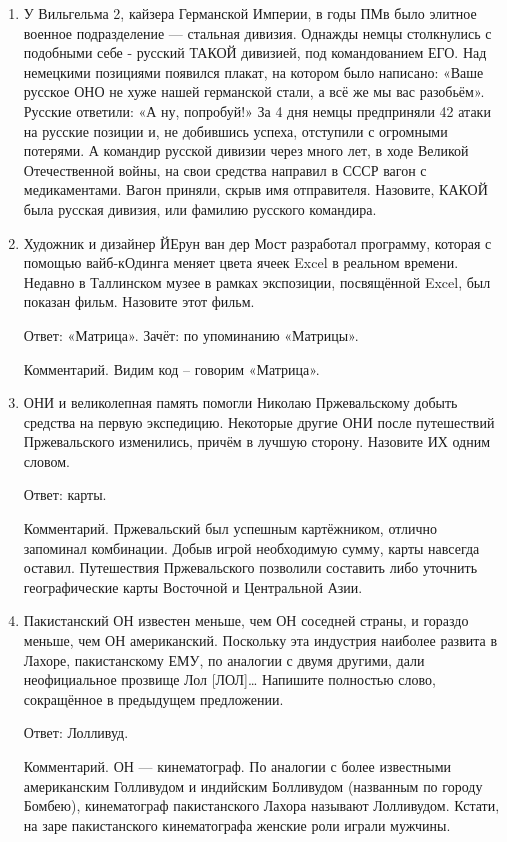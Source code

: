 \documentclass[oneside,final,14pt]{extreport}
\begin{document}
\begin{enumerate}
    \item У Вильгельма 2, кайзера Германской Империи, в годы ПМв было элитное военное подразделение — стальная дивизия. Однажды немцы столкнулись с подобными себе - русский ТАКОЙ дивизией, под командованием ЕГО. Над немецкими позициями появился плакат, на котором было написано: «Ваше русское ОНО не хуже нашей германской стали, а всё же мы вас разобьём». Русские ответили: «А ну, попробуй!» За 4 дня немцы предприняли 42 атаки на русские позиции и, не добившись успеха, отступили с огромными потерями. А командир русской дивизии через много лет, в ходе Великой Отечественной войны, на свои средства направил в СССР вагон с медикаментами. Вагон приняли, скрыв имя отправителя. Назовите, КАКОЙ была русская дивизия, или фамилию русского командира.

    \item Художник и дизайнер ЙЕрун ван дер Мост разработал программу, которая с помощью вайб-кОдинга меняет цвета ячеек Excel в реальном времени. Недавно в Таллинском музее в рамках экспозиции, посвящённой Excel, был показан фильм. Назовите этот фильм.

    Ответ: «Матрица». Зачёт: по упоминанию «Матрицы».

    Комментарий. Видим код – говорим «Матрица».

    \item ОНИ и великолепная память помогли Николаю Пржевальскому добыть средства на первую экспедицию. Некоторые другие ОНИ после путешествий Пржевальского изменились, причём в лучшую сторону. Назовите ИХ одним словом.

    Ответ: карты.

    Комментарий. Пржевальский был успешным картёжником, отлично запоминал
    комбинации. Добыв игрой необходимую сумму, карты навсегда оставил. Путешествия Пржевальского позволили составить либо уточнить географические карты Восточной и Центральной Азии.

    \item Пакистанский ОН известен меньше, чем ОН соседней страны, и гораздо меньше, чем ОН американский. Поскольку эта индустрия наиболее развита в Лахоре, пакистанскому ЕМУ, по аналогии с двумя другими, дали неофициальное прозвище Лол [ЛОЛ]… Напишите полностью слово, сокращённое в предыдущем предложении.

    Ответ: Лолливуд.

    Комментарий. ОН — кинематограф. По аналогии с более известными американским Голливудом и индийским Болливудом (названным по городу Бомбею), кинематограф пакистанского Лахора называют Лолливудом. Кстати, на заре пакистанского кинематографа женские роли играли мужчины.


\end{enumerate}
\end{document}
